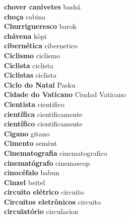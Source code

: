 \textbf{ chover canivetes  } bashá \\
\textbf{ choça  } cabina \\
\textbf{ Churrigueresco  } barok \\
\textbf{ chávena  } kòpi \\
\textbf{ cibernética  } cibernetico \\
\textbf{ Ciclismo  } ciclismo \\
\textbf{ Ciclista  } ciclista \\
\textbf{ Ciclistas  } ciclista \\
\textbf{ Ciclo do Natal  } Pasku \\
\textbf{ Cidade do Vaticano  } Ciudad Vaticano \\
\textbf{ Cientista  } cientifico \\
\textbf{ científica  } cientificamente \\
\textbf{ científico  } cientificamente \\
\textbf{ Cigano  } gitano \\
\textbf{ Cimento  } semènt \\
\textbf{ Cinematografia  } cinematografico \\
\textbf{ cinematógrafo  } cinemascop \\
\textbf{ cinocéfalo  } babun \\
\textbf{ Cinzel  } beitel \\
\textbf{ circuito elétrico  } circuito \\
\textbf{ Circuitos eletrônicos  } circuito \\
\textbf{ circulatório  } circulacion \\
